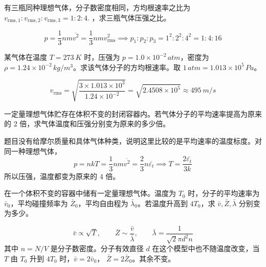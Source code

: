 \documentclass[lang=cn,11pt]{elegantbook}
\begin{document}
\begin{exercise}
有三瓶同种理想气体，分子数密度相同，方均根速率之比为 \(v_{\mathrm{rms},1}:v_{\mathrm{rms},2}:v_{\mathrm{rms},3}=1:2:4.\) ，求三瓶气体压强之比。
\end{exercise}

\begin{solution}
 \[p=\frac13 nm\overline{v^2} =\frac13nmv_{\mathrm{rms}}^2\implies p_1:p_2:p_3 =1^2:2^2:4^2 =1:4:16\]
\end{solution}

\begin{exercise}
某气体在温度 \(T=\SI{273}{K}\) 时，压强为 \(p=1.0\times10^{-2}\,\si{atm}\)，密度为 \(\rho=1.24\times10^{-2}\,\si{kg/m^3}\)。求该气体分子的方均根速率。取 \(1\,\si{atm}=1.013\times10^5\,\si{Pa}\)。
\end{exercise}

\begin{solution}
\[v_{\mathrm{rms}} =\sqrt{\frac{3\times1.013\times10^3}{1.24\times10^{-2}}} =\sqrt{2.4508\times10^5} \approx \SI{495}{m/s}\]
\end{solution}

\begin{exercise}
一定量理想气体贮存在体积不变的封闭容器内。若气体分子的平均速率提高为原来的 \(2\) 倍，求气体温度和压强分别变为原来的多少倍。
\end{exercise}

\begin{solution}
题目没有给摩尔质量和具体气体种类，说明这里比较的是平均速率的温度标度。对同一种理想气体，
 \[p=nkT=\frac{1}{3}nm\overline{v^2}=\frac23n\overline{\varepsilon_t}\implies T=\frac{2\overline{\varepsilon_t}}{3k}\]
 所以压强，温度都变为原来的 \(4\) 倍。
\end{solution}

\begin{exercise}
在一个体积不变的容器中储有一定量理想气体。温度为 \(T_0\) 时，分子的平均速率为 \(\bar v_0\)，平均碰撞频率为 \(\bar Z_0\)，平均自由程为 \(\bar\lambda_0\)。若温度升高到 \(4T_0\)，求 \(\bar v,\bar Z,\bar\lambda\) 分别变为多少。
\end{exercise}

\begin{solution}
 \[\bar v\propto\sqrt{T},\qquad \bar Z\sim \frac{\bar v}{\bar\lambda},\qquad \bar\lambda=\frac{1}{\sqrt2\pi d^2 n}\] 
其中 \(n=N/V\) 是分子数密度。分子有效直径 \(d\) 在这个模型中也不随温度改变，当 \(T\) 由 \(T_0\) 升到 \(4T_0\) 时，\(\bar v=2\bar v_0\)， \(\bar Z=2\bar Z_0\)。其余不变。
\end{solution}
\end{document}
